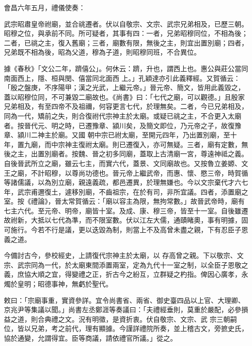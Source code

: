 \begin{pinyinscope}
 會昌六年五月，禮儀使奏：



 武宗昭肅皇帝祔廟，並合祧遷者。伏以自敬宗、文宗、武宗兄弟相及，已歷三朝。昭穆之位，與承前不同。所可疑者，其事有四：一者，兄弟昭穆同位，不相為後；二者，已祧之主，復入舊廟；三者，廟數有限，無後之主，則宜出置別廟；四者，兄弟既不相為後，昭為父道，穆為子道，則昭穆同班，不合異位。



 據《春秋》「文公二年，躋僖公」。何休云：躋，升也，謂西上也。惠公與莊公當同南面西上，隱、桓與閔、僖當同北面西
 上。」孔穎達亦引此義釋經。又賀循云：「殷之盤庚，不序陽甲；漢之光武，上繼元帝。」晉元帝、簡文，皆用此義毀之，蓋以昭穆位同，不可兼毀二廟故也。《尚書》曰：「七代之廟，可以觀德。」且殷家兄弟相及，有至四帝不及祖禰，何容更言七代，於理無矣。二者，今已兄弟相及，同為一代，矯前之失，則合復祔代宗神主於太廟。或疑已祧之主，不合更入太廟者。按晉代元、明之時，已遷豫章、潁川矣，及簡文即位，乃元帝之子，故復豫章、潁川二神主於廟。又國
 朝中宗已祔太廟，至開元四年，乃出置別廟，至十年，置九廟，而中宗神主復祔太廟。則已遷復入，亦可無疑。三者，廟有定數，無後之主，出置別廟者。按魏、晉之初多同廟，蓋取上古清廟一宮，尊遠神祗之義。自後晉武所立之廟，雖云七主，而實六代，蓋景、文同廟故也。又按魯立姜嫄、文王之廟，不計昭穆，以尊尚功德也。晉元帝上繼武帝，而惠、懷、愍三帝，時賀循等諸儒議，以為別立廟，親遠義疏，都邑遷異，於理無嫌也。今以文宗棄代才六七
 年，武宗甫邇復土，遽移別廟，不齒祖宗，在於有司，非所宜議。四者，添置廟之室。按《禮論》，晉太常賀循云：「廟以容主為限，無拘常數。」故晉武帝時，廟有七主六代。至元帝、明帝，廟皆十室。及成、康、穆三帝，皆至十一室。自後雖遷故祔新，大抵以七代為準，而不限室數。伏以江左大儒，通賾睹奧，事有明據，固可施行。今若不行是議，更以迭毀為制，則當上不及高曾未盡之親，下有忍臣子恩義之道。



 今備討古今，參校經史，上請復代宗神主於太廟，以
 存高曾之親。下以敬宗、文宗、武宗同為一代，於太廟東間添置兩室，定為九代十一室之制，以全臣子恩敬之義，庶協大順之宜，得變禮之正，折古今之紛互，立群疑之杓指。俾因心廣孝，永燭於皇明；昭德事神，無虧於聖代。



 敕曰：「宗廟事重，實資參詳。宜令尚書省、兩省、御史臺四品以上官、大理卿、京兆尹等集議以聞。」尚書左丞鄭涯等奏議曰：「夫禮經垂則，莫重於嚴配，必參損益之道，則合典禮之文。況有明徵，是資折衷。伏自敬宗、文宗、武
 宗三朝嗣位，皆以兄弟，考之前代，理有顯據。今謹詳禮院所奏，並上稽古文，旁摭史氏，協於通變，允謂得宜。臣等商議，請依禮官所議。」從之。




\end{pinyinscope}
